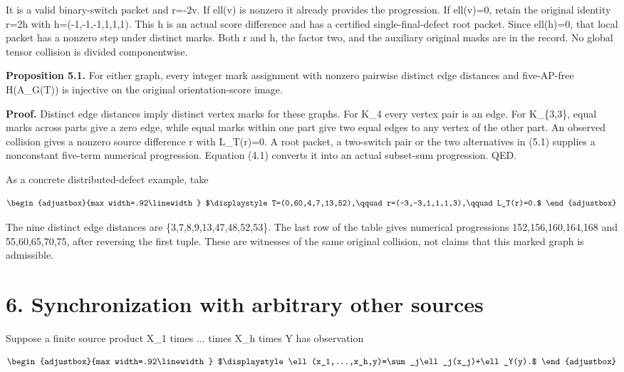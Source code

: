 It is a valid binary-switch packet and r=-2v. If ell(v) is nonzero it already provides the progression. If ell(v)=0, retain the original identity r=2h with h=(-1,-1,-1,1,1,1). This h is an actual score difference and has a certified single-final-defect root packet. Since ell(h)=0, that local packet has a nonzero step under distinct marks. Both r and h, the factor two, and the auxiliary original masks are in the record. No global tensor collision is divided componentwise.

\textbf{Proposition 5.1.} For either graph, every integer mark assignment with nonzero pairwise distinct edge distances and five-AP-free H(A\_G(T)) is injective on the original orientation-score image.

\textbf{Proof.} Distinct edge distances imply distinct vertex marks for these graphs. For K\_4 every vertex pair is an edge. For K\_\{3,3\}, equal marks across parts give a zero edge, while equal marks within one part give two equal edges to any vertex of the other part. An observed collision gives a nonzero source difference r with L\_T(r)=0. A root packet, a two-switch pair or the two alternatives in (5.1) supplies a nonconstant five-term numerical progression. Equation (4.1) converts it into an actual subset-sum progression. QED.

As a concrete distributed-defect example, take

\[
\begin{adjustbox}{max width=.92\linewidth}
$\displaystyle T=(0,60,4,7,13,52),\qquad r=(-3,-3,1,1,1,3),\qquad L_T(r)=0.$
\end{adjustbox}
\]

The nine distinct edge distances are \{3,7,8,9,13,47,48,52,53\}. The last row of the table gives numerical progressions 152,156,160,164,168 and 55,60,65,70,75, after reversing the first tuple. These are witnesses of the same original collision, not claims that this marked graph is admissible.

\section{6. Synchronization with arbitrary other sources}\label{n16-synchronization-with-arbitrary-other-sources}

Suppose a finite source product X\_1 times ... times X\_h times Y has observation

\[
\begin{adjustbox}{max width=.92\linewidth}
$\displaystyle \ell(x_1,...,x_h,y)=\sum_j\ell_j(x_j)+\ell_Y(y).$
\end{adjustbox}
\]

